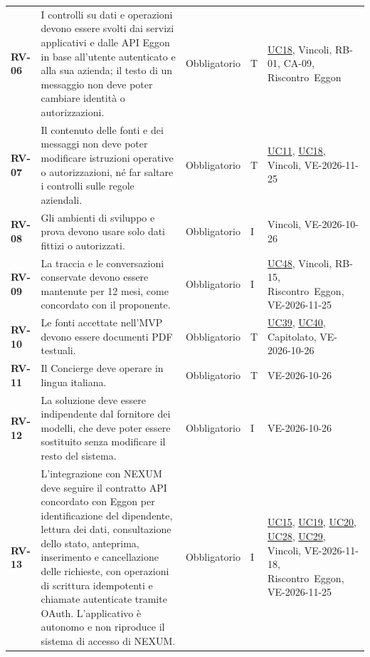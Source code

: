 \documentclass[documento]{gpt}
\begin{document}
{\begin{longtable}{@{}>{\raggedright\arraybackslash}p{1.35cm}>{\raggedright\arraybackslash}p{7.3cm}>{\raggedright\arraybackslash}p{1.9cm}>{\centering\arraybackslash}p{0.75cm}>{\raggedright\arraybackslash}p{3.1cm}@{}}
\leavevmode\hypertarget{req:RV-06}{\textbf{RV-06}} & I controlli su dati e operazioni devono essere svolti dai servizi applicativi e dalle API Eggon in base all’utente autenticato e alla sua azienda; il testo di un messaggio non deve poter cambiare identità o autorizzazioni. & Obbligatorio & T & \hyperref[uc:non_aut]{UC18}, \mbox{Vincoli}, \mbox{RB-01}, \mbox{CA-09}, \mbox{Riscontro Eggon} \\
\leavevmode\hypertarget{req:RV-07}{\textbf{RV-07}} & Il contenuto delle fonti e dei messaggi non deve poter modificare istruzioni operative o autorizzazioni, né far saltare i controlli sulle regole aziendali. & Obbligatorio & T & \hyperref[uc:regole]{UC11}, \hyperref[uc:non_aut]{UC18}, \mbox{Vincoli}, \mbox{VE-2026-11-25} \\
\leavevmode\hypertarget{req:RV-08}{\textbf{RV-08}} & Gli ambienti di sviluppo e prova devono usare solo dati fittizi o autorizzati. & Obbligatorio & I & \mbox{Vincoli}, \mbox{VE-2026-10-26} \\
\leavevmode\hypertarget{req:RV-09}{\textbf{RV-09}} & La traccia e le conversazioni conservate devono essere mantenute per 12 mesi, come concordato con il proponente. & Obbligatorio & I & \hyperref[uc:tr_elenco]{UC48}, \mbox{Vincoli}, \mbox{RB-15}, \mbox{Riscontro Eggon}, \mbox{VE-2026-11-25} \\
\leavevmode\hypertarget{req:RV-10}{\textbf{RV-10}} & Le fonti accettate nell’MVP devono essere documenti PDF testuali. & Obbligatorio & T & \hyperref[uc:fn_carica]{UC39}, \hyperref[uc:fn_formato]{UC40}, \mbox{Capitolato}, \mbox{VE-2026-10-26} \\
\leavevmode\hypertarget{req:RV-11}{\textbf{RV-11}} & Il Concierge deve operare in lingua italiana. & Obbligatorio & T & \mbox{VE-2026-10-26} \\
\leavevmode\hypertarget{req:RV-12}{\textbf{RV-12}} & La soluzione deve essere indipendente dal fornitore dei modelli, che deve poter essere sostituito senza modificare il resto del sistema. & Obbligatorio & I & \mbox{VE-2026-10-26} \\
\leavevmode\hypertarget{req:RV-13}{\textbf{RV-13}} & L’integrazione con NEXUM deve seguire il contratto API concordato con Eggon per identificazione del dipendente, lettura dei dati, consultazione dello stato, anteprima, inserimento e cancellazione delle richieste, con operazioni di scrittura idempotenti e chiamate autenticate tramite OAuth. L’applicativo è autonomo e non riproduce il sistema di accesso di NEXUM. & Obbligatorio & I & \hyperref[uc:dati]{UC15}, \hyperref[uc:stato_rich]{UC19}, \hyperref[uc:registra]{UC20}, \hyperref[uc:op_incerto]{UC28}, \hyperref[uc:annulla_inv]{UC29}, \mbox{Vincoli}, \mbox{VE-2026-11-18}, \mbox{Riscontro Eggon}, \mbox{VE-2026-11-25} \\

\end{longtable}}
\end{document}
